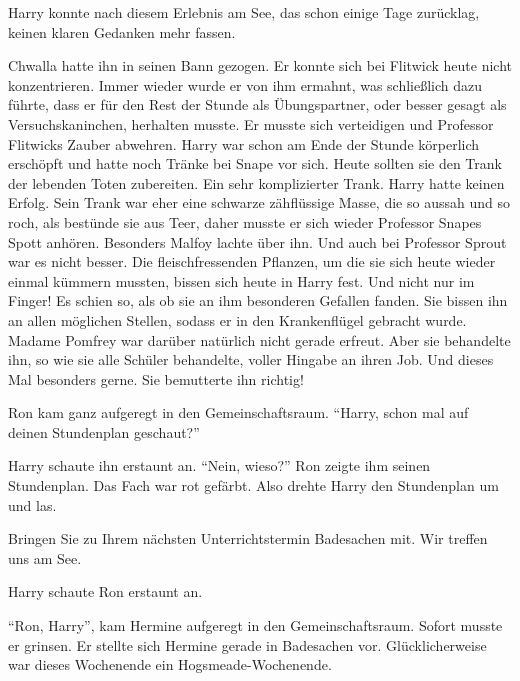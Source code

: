 Harry konnte nach diesem Erlebnis am See, das schon einige Tage zurücklag, keinen klaren Gedanken mehr fassen.

\begin{rueckblick}
Chwalla hatte ihn in seinen Bann gezogen. Er konnte sich bei Flitwick heute nicht konzentrieren. Immer wieder wurde er von ihm ermahnt, was schließlich dazu führte, dass er für den Rest der Stunde als Übungspartner, oder besser gesagt als Versuchskaninchen, herhalten musste. Er musste sich verteidigen und Professor Flitwicks Zauber abwehren. Harry war schon am Ende der Stunde körperlich erschöpft und hatte noch Tränke bei Snape vor sich. Heute sollten sie den Trank der lebenden Toten zubereiten. Ein sehr komplizierter Trank. Harry hatte keinen Erfolg. Sein Trank war eher eine schwarze zähflüssige Masse, die so aussah und so roch, als bestünde sie aus Teer, daher musste er sich wieder Professor Snapes Spott anhören. Besonders Malfoy lachte über ihn. Und auch bei Professor Sprout war es nicht besser. Die fleischfressenden Pflanzen, um die sie sich heute wieder einmal kümmern mussten, bissen sich heute in Harry fest. Und nicht nur im Finger! Es schien so, als ob sie an ihm besonderen Gefallen fanden. Sie bissen ihn an allen möglichen Stellen, sodass er in den Krankenflügel gebracht wurde. Madame Pomfrey war darüber natürlich nicht gerade erfreut. Aber sie behandelte ihn, so wie sie alle Schüler behandelte, voller Hingabe an ihren Job. Und dieses Mal besonders gerne. Sie bemutterte ihn richtig!
\end{rueckblick}

\onelineback %
\trenn

Ron kam ganz aufgeregt in den Gemeinschaftsraum. \enquote{Harry, schon mal auf deinen Stundenplan geschaut?}

Harry schaute ihn erstaunt an. \enquote{Nein, wieso?} Ron zeigte ihm seinen Stundenplan. Das Fach \VgddK war rot gefärbt. Also drehte Harry den Stundenplan um und las.

\begin{brief}
Bringen Sie zu Ihrem nächsten Unterrichtstermin Badesachen mit. Wir treffen uns am See.
\end{brief}

Harry schaute Ron erstaunt an.

\enquote{Ron, Harry}, kam Hermine aufgeregt in den Gemeinschaftsraum. Sofort musste er grinsen. Er stellte sich Hermine gerade in Badesachen vor. Glücklicherweise war dieses Wochenende ein Hogsmeade-Wochenende.

